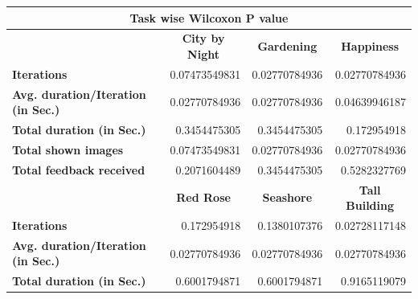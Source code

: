 \documentclass[english]{tktltiki}
\begin{document}
\begin{table}
	\small
	\begin{center}
    \begin{tabular}{|l|r|r|r|}
        \hline
        \multicolumn{4}{|c|}{\textbf{Task wise Wilcoxon P value}} \\
        \hline
        
        
        
        \multicolumn{1}{|c|}{} & \multicolumn{1}{|c|}{\textbf{City by Night}} & \multicolumn{1}{|c|}{\textbf{Gardening}} & \multicolumn{1}{|c|}{\textbf{Happiness}} \\
        \hline
        
        \multicolumn{1}{|l|}{\textbf{Iterations}} & 0.07473549831 & 0.02770784936 & 0.02770784936 \\
        \hline
        
        \multicolumn{1}{|l|}{\textbf{Avg. duration/Iteration (in Sec.)}} & 0.02770784936 & 0.02770784936 & 0.04639946187 \\
        \hline
        
        \multicolumn{1}{|l|}{\textbf{Total duration (in Sec.)}} & 0.3454475305 & 0.3454475305 & 0.172954918 \\
        \hline
        
        \multicolumn{1}{|l|}{\textbf{Total shown images}} & 0.07473549831 & 0.02770784936 & 0.02770784936 \\
        \hline
        
        \multicolumn{1}{|l|}{\textbf{Total feedback received}} & 0.2071604489 & 0.3454475305 & 0.5282327769 \\
        \hline
        \hline
        
        \multicolumn{1}{|c|}{} & \multicolumn{1}{|c|}{\textbf{Red Rose}} & \multicolumn{1}{|c|}{\textbf{Seashore}} & \multicolumn{1}{|c|}{\textbf{Tall Building}} \\
        \hline
		
		\multicolumn{1}{|l|}{\textbf{Iterations}} & 0.172954918 & 0.1380107376 & 0.02728117148 \\
        \hline
        
        \multicolumn{1}{|l|}{\textbf{Avg. duration/Iteration (in Sec.)}} & 0.02770784936 & 0.02770784936 & 0.02770784936 \\
        \hline
        
        \multicolumn{1}{|l|}{\textbf{Total duration (in Sec.)}} & 0.6001794871 & 0.6001794871 & 0.9165119079 \\
        \hline
        

\end{tabular}
\end{center}
\end{table}
\end{document}
